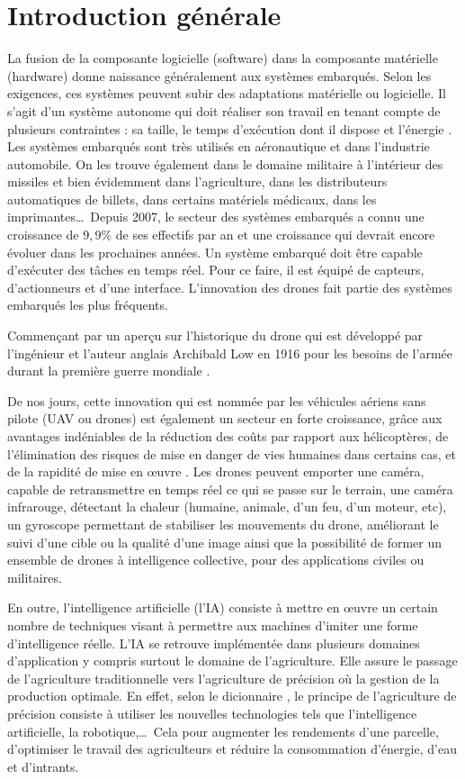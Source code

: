 
\chapter*{Introduction générale}
La fusion de la composante logicielle (software) dans la composante matérielle (hardware) donne naissance généralement aux systèmes embarqués.
Selon les exigences, ces systèmes peuvent subir des adaptations matérielle ou logicielle. Il s'agit d'un système autonome qui doit réaliser son travail en tenant compte de plusieurs contraintes : sa taille, le temps d'exécution dont il dispose et l'énergie \cite{FUTURA}. Les systèmes embarqués sont très utilisés en aéronautique et dans l'industrie automobile. On les trouve également dans le domaine militaire à l'intérieur des missiles et bien évidemment dans l'agriculture, dans les distributeurs automatiques de billets, dans certains matériels médicaux, dans les imprimantes\ldots\  Depuis 2007, le secteur des systèmes embarqués a connu une croissance de $9,9\%$ de ses effectifs par an \cite{PierreAudoin2012} et une croissance qui devrait encore évoluer dans les prochaines années. Un système embarqué doit être capable d'exécuter des tâches en temps réel. Pour ce faire, il est équipé de capteurs, d'actionneurs et d'une interface. L'innovation des drones fait partie des systèmes embarqués les plus fréquents. 

Commençant par un aperçu sur l'historique du drone qui est développé par l'ingénieur et l'auteur anglais Archibald Low en 1916 pour les besoins de l'armée durant la première guerre mondiale \cite{STUDIOFLY}. 

De nos jours, cette innovation qui est nommée par les véhicules aériens sans pilote (UAV ou drones) est également un secteur en forte croissance, grâce aux avantages indéniables de la réduction des coûts par rapport aux hélicoptères, de l'élimination des risques de mise en danger de vies humaines dans certains cas, et de la rapidité de mise en œuvre \cite{AltiGator}. Les drones peuvent emporter une caméra, capable de retransmettre en temps réel ce qui se passe sur le terrain, une caméra infrarouge, détectant la chaleur (humaine, animale, d'un feu, d'un moteur, etc), un gyroscope permettant de stabiliser les mouvements du drone, améliorant le suivi d'une cible ou la qualité d'une image ainsi que la possibilité de former un ensemble de drones à intelligence collective, pour des applications civiles ou militaires. 

En outre, l'intelligence artificielle (l'IA) consiste à mettre en œuvre un certain nombre de techniques visant à permettre aux machines d'imiter une forme d'intelligence réelle. L'IA se retrouve implémentée dans plusieurs domaines d'application\cite{netactions} y compris surtout le domaine de l'agriculture. Elle assure le passage de l'agriculture traditionnelle vers l'agriculture de précision où la gestion de la production optimale. En effet, selon le dicionnaire \cite{leshorizons}, le principe de l'agriculture de précision consiste à utiliser les nouvelles technologies tels que l'intelligence artificielle, la robotique,\ldots\ Cela pour augmenter les rendements d'une parcelle, d'optimiser le travail des agriculteurs et réduire la consommation d'énergie, d'eau et d'intrants.

